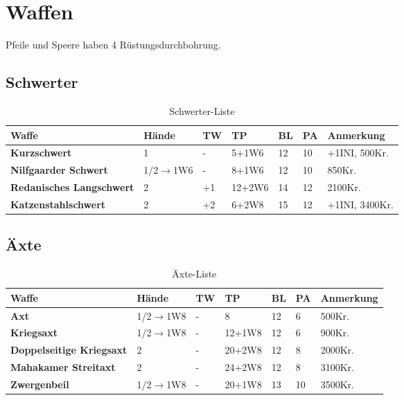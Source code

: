 {\let\clearpage\relax\chapter{Waffen}}
Pfeile und Speere haben 4 Rüstungsdurchbohrung.

\section{Schwerter}
\begin{table}[H]
\begin{center}
\begin{tabular}{|l|l|l|l|l|l|l|}
\hline
\textbf{Waffe} & \textbf{Hände} & \textbf{TW} & \textbf{TP} & \textbf{BL} & \textbf{PA} & \textbf{Anmerkung} \\

\hline
\textbf{Kurzschwert} & 1 & - & 5+1W6 & 12 & 10 & +1INI, 500Kr. \\

\hline
\textbf{Nilfgaarder Schwert} & 1/2$ \rightarrow $1W6 & - & 8+1W6 & 12 & 10 & 850Kr. \\

\hline
\textbf{Redanisches Langschwert} & 2 & +1 & 12+2W6 & 14 & 12 & 2100Kr. \\

\hline
\textbf{Katzenstahlschwert} & 2 & +2 & 6+2W8 & 15 & 12 & +1INI, 3400Kr. \\

\hline
\end{tabular}
\end{center}
\caption{Schwerter-Liste}
\label{tab:Schwerter}
\end{table}


\section{Äxte}
\begin{table}[H]
\begin{center}
\begin{tabular}{|p{3.5cm}|l|l|l|l|l|p{2.5cm}|}
\hline
\textbf{Waffe} & \textbf{Hände} & \textbf{TW} & \textbf{TP} & \textbf{BL} & \textbf{PA} & \textbf{Anmerkung} \\

\hline
\textbf{Axt} & 1/2$ \rightarrow $1W8 & - & 8 & 12 & 6 & 500Kr. \\

\hline
\textbf{Kriegsaxt} & 1/2$ \rightarrow $1W8 & - & 12+1W8 & 12 & 6 & 900Kr. \\

\hline
\textbf{Doppelseitige Kriegsaxt} & 2 & - & 20+2W8 & 12 & 8 & 2000Kr. \\

\hline
\textbf{Mahakamer Streitaxt} & 2 & - & 24+2W8 & 12 & 8 & 3100Kr. \\

\hline
\textbf{Zwergenbeil} & 1/2$ \rightarrow $1W8 & - & 20+1W8 & 13 & 10 & 3500Kr. \\

\hline
\end{tabular}
\end{center}
\caption{Äxte-Liste}
\label{tab:Äxte}
\end{table}

